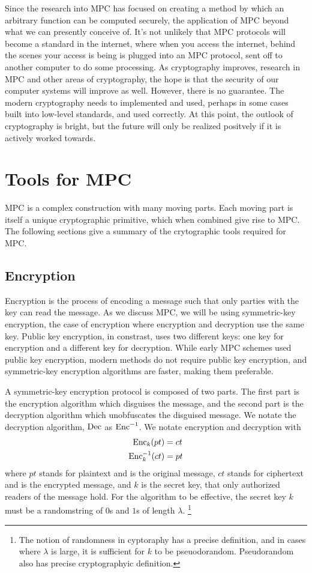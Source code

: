Since the research into MPC has focused on creating a method by which an arbitrary function can be computed securely, the application of MPC beyond what we can presently conceive of. 
It's not unlikely that MPC protocols will become a standard in the internet, where when you access the internet, behind the scenes your access is being is plugged into an MPC protocol, sent off to another computer to do some processing. 
As cryptography improves, research in MPC and other areas of cryptography, the hope is that the security of our computer systems will improve as well.
However, there is no guarantee. 
The modern cryptography needs to implemented and used, perhaps in some cases built into low-level standards, and used correctly.
At this point, the outlook of cryptography is bright, but the future will only be realized positvely if it is actively worked towards.

\section{Tools for MPC}
MPC is a complex construction with many moving parts. 
Each moving part is itself a unique cryptographic primitive, which when combined give rise to MPC.
The following sections give a summary of the crytographic tools required for MPC.

\subsection{Encryption}
Encryption is the process of encoding a message such that only parties with the key can read the message.
As we discuss MPC, we will be using symmetric-key encryption, the case of encryption where encryption and decryption use the same key.
Public key encryption, in constrast, uses two different keys: one key for encryption and a different key for decryption.
While early MPC schemes used public key encryption, modern methods do not require public key encryption, and symmetric-key encryption algorithms are faster, making them preferable.

A symmetric-key encryption protocol is composed of two parts.
The first part is the encryption algorithm which disguises the message, and the second part is the decryption algorithm which unobfuscates the disguised message.
We notate the decryption algorithm, $\operatorname{Dec}$ as $\operatorname{Enc}^{-1}$.
We notate encryption and decryption with
\begin{equation}
    \label{eqn:encryption}
    \begin{split}
        \operatorname{Enc}_k (pt) & = ct  \\
        \operatorname{Enc}^{-1}_k(ct) & = pt
    \end{split}
\end{equation}
where $pt$ stands for plaintext and is the original message, $ct$ stands for ciphertext and is the encrypted message, and $k$ is the secret key, that only authorized readers of the message hold.
For the algorithm to be effective, the secret key $k$ must be a randomstring of $0$s and $1$s of length $\lambda$.
\footnote{The notion of randomness in cyptoraphy has a precise definition, and in cases where $\lambda$ is large, it is sufficient for $k$ to be pseuodorandom. Pseudorandom also has precise cryptographyic definition.}

